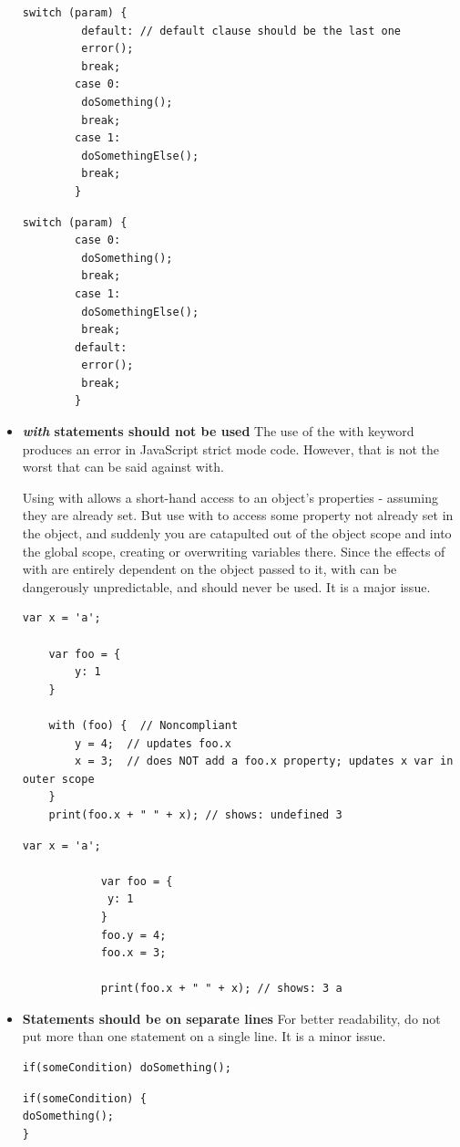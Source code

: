 \begin{itemize}
\begin{lstlisting}[caption=Noncompliant Code Example]
		switch (param) {
		 default: // default clause should be the last one
		 error();
		 break;
		case 0:
		 doSomething();
		 break;
		case 1:
		 doSomethingElse();
		 break;
		}
		\end{lstlisting}
		
		\begin{lstlisting}[caption=Compliant Solution]
		switch (param) {
		case 0:
		 doSomething();
		 break;
		case 1:
		 doSomethingElse();
		 break;
		default:
		 error();
		 break;
		}
		\end{lstlisting}	
	
	
	\item \textbf{\textit{with} statements should not be used}
	The use of the with keyword produces an error in JavaScript strict mode code. However, that is not the worst that can be said against with.
	
	Using with allows a short-hand access to an object's properties - assuming they are already set. But use with to access some property not already set in the object, and suddenly you are catapulted out of the object scope and into the global scope, creating or overwriting variables there. Since the effects of with are entirely dependent on the object passed to it, with can be dangerously unpredictable, and should never be used. It is a major issue.
	
		\begin{lstlisting}[caption=Noncompliant Code Example]
	var x = 'a';
	
	var foo = {
		y: 1
	}
	
	with (foo) {  // Noncompliant
		y = 4;  // updates foo.x
		x = 3;  // does NOT add a foo.x property; updates x var in outer scope
	}
	print(foo.x + " " + x); // shows: undefined 3
		\end{lstlisting}
		
			\begin{lstlisting}[caption=Compliant Solution]
			var x = 'a';
			
			var foo = {
			 y: 1
			}
			foo.y = 4;
			foo.x = 3;
			
			print(foo.x + " " + x); // shows: 3 a
			\end{lstlisting}
			
		
	\item \textbf{Statements should be on separate lines}
	For better readability, do not put more than one statement on a single line. It is a minor issue.
	
	\begin{lstlisting}[caption=Noncompliant Code Example]
	if(someCondition) doSomething();
	\end{lstlisting}
	
	\begin{lstlisting}[caption=Compliant Solution]
if(someCondition) {
doSomething();
}
	\end{lstlisting}
	
	

\end{itemize}


